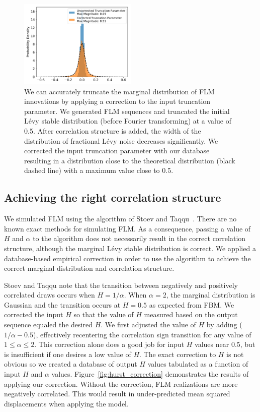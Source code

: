\documentclass{article}
\begin{document}
  \begin{figure}
  \centering
  \includegraphics[width=0.5\textwidth]{truncation_correction.pdf}
  \caption{We can accurately truncate the marginal distribution of FLM innovations by
  applying a correction to the input truncation parameter. We generated FLM sequences
  and truncated the initial L\'evy stable distribution (before Fourier transforming) at 
  a value of 0.5. After correlation structure is added, the width of the distribution 
  of fractional L\'evy noise decreases significantly. We corrected the input truncation
  parameter with our database resulting in a distribution close to the theoretical
  distribution (black dashed line) with a maximum value close to 0.5.}\label{fig:truncation_correction}
  \end{figure}
  
  \subsection{Achieving the right correlation structure}\label{section:flm_correlation}
  
  We simulated FLM using the algorithm of Stoev and Taqqu~\cite{stoev_simulation_2004}.
  There are no known exact methods for simulating FLM. As a consequence, passing a
  value of $H$ and $\alpha$ to the algorithm does not necessarily result in the correct
  correlation structure, although the marginal L\'evy stable distribution is correct. 
  We applied a database-based empirical correction in order to use the
  algorithm to achieve the correct marginal distribution and correlation structure.
  
  Stoev and Taqqu note that the transition between negatively and positively correlated
  draws occurs when $H = 1/ \alpha$. When $\alpha=2$, the marginal distribution is 
  Gaussian and the transition occurs at $H=0.5$ as expected from FBM. We corrected 
  the input $H$ so that the value of $H$ measured based on the output sequence equaled
  the desired $H$. We first adjusted the value of $H$ by adding ($1 / \alpha - 0.5$),
  effectively recentering the correlation sign transition for any value of $1 \leq \alpha \leq 2$.
  This correction alone does a good job for input $H$ values near 0.5, but is
  insufficient if one desires a low value of $H$. The exact correction to $H$ is 
  not obvious so we created a database of output $H$ values tabulated as a function
  of input $H$ and $\alpha$ values. Figure~\ref{fig:hurst_correction} demonstrates the
  results of applying our correction. Without the correction, FLM realizations are
  more negatively correlated. This would result in under-predicted mean squared
  displacements when applying the model.
  
\end{document}
